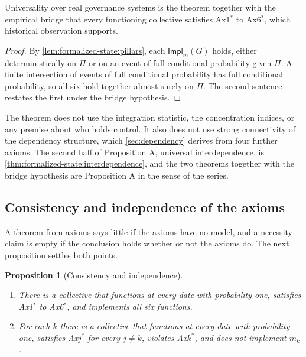 \documentclass[11pt,letterpaper]{article}
\newtheorem{proposition}[theorem]{Proposition}
\theoremstyle{definition}
\theoremstyle{remark}
\newcommand{\Impl}{\mathsf{Impl}}
\begin{document}
Universality over real governance systems is the theorem together with the empirical bridge that every functioning collective satisfies Ax1$^{*}$ to Ax6$^{*}$, which historical observation supports.

\begin{proof}
By \cref{lem:formalized-state:pillars}, each $\Impl_m(G)$ holds, either deterministically on $\Pi$ or on an event of full conditional probability given $\Pi$. A finite intersection of events of full conditional probability has full conditional probability, so all six hold together almost surely on $\Pi$. The second sentence restates the first under the bridge hypothesis.
\end{proof}

The theorem does not use the integration statistic, the concentration indices, or any premise about who holds control. It also does not use strong connectivity of the dependency structure, which \cref{sec:dependency} derives from four further axioms. The second half of Proposition A, universal interdependence, is \cref{thm:formalized-state:interdependence}, and the two theorems together with the bridge hypothesis are Proposition A in the sense of the series.

\subsection{Consistency and independence of the axioms}

A theorem from axioms says little if the axioms have no model, and a necessity claim is empty if the conclusion holds whether or not the axioms do. The next proposition settles both points.

\begin{proposition}[Consistency and independence]
\label{prop:formalized-state:independence}
\leavevmode
\begin{enumerate}[label=(\alph*)]
\item There is a collective that functions at every date with probability one, satisfies Ax1$^{*}$ to Ax6$^{*}$, and implements all six functions.
\item For each $k$ there is a collective that functions at every date with probability one, satisfies Ax$j^{*}$ for every $j\neq k$, violates Ax$k^{*}$, and does not implement $m_k$.
\end{enumerate}
\end{proposition}
\end{document}
